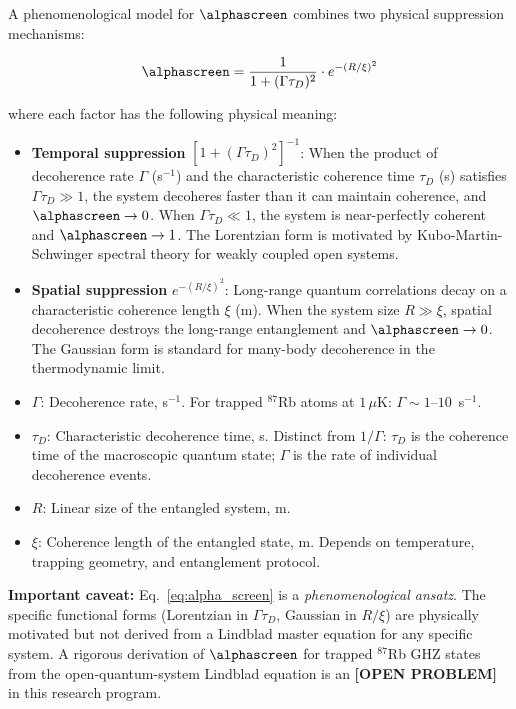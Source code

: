 A phenomenological model for $\alphascreen$ combines two physical
suppression mechanisms:

\begin{equation}
    \alphascreen = \frac{1}{1 + (\Gamma\tau_D)^2}
    \cdot e^{-(R/\xi)^2}
    \label{eq:alpha_screen}
\end{equation}

\noindent where each factor has the following physical meaning:

\begin{itemize}
    \item \textbf{Temporal suppression} $[1 + (\Gamma\tau_D)^2]^{-1}$:
    When the product of decoherence rate $\Gamma$ (s$^{-1}$) and the
    characteristic coherence time $\tau_D$ (s) satisfies
    $\Gamma\tau_D \gg 1$, the system decoheres faster than it can maintain
    coherence, and $\alphascreen \to 0$. When $\Gamma\tau_D \ll 1$, the
    system is near-perfectly coherent and $\alphascreen \to 1$. The
    Lorentzian form is motivated by Kubo-Martin-Schwinger spectral theory
    for weakly coupled open systems.

    \item \textbf{Spatial suppression} $e^{-(R/\xi)^2}$: Long-range
    quantum correlations decay on a characteristic coherence length $\xi$
    (m). When the system size $R \gg \xi$, spatial decoherence destroys
    the long-range entanglement and $\alphascreen \to 0$. The Gaussian
    form is standard for many-body decoherence in the thermodynamic limit.

    \item $\Gamma$: Decoherence rate, s$^{-1}$. For trapped $^{87}$Rb
    atoms at $1\,\mu$K: $\Gamma \sim 1$--$10$~s$^{-1}$.

    \item $\tau_D$: Characteristic decoherence time, s. Distinct from
    $1/\Gamma$: $\tau_D$ is the coherence time of the macroscopic
    quantum state; $\Gamma$ is the rate of individual decoherence events.

    \item $R$: Linear size of the entangled system, m.

    \item $\xi$: Coherence length of the entangled state, m. Depends on
    temperature, trapping geometry, and entanglement protocol.
\end{itemize}

\noindent\textbf{Important caveat:} Eq.~\eqref{eq:alpha_screen} is a
\emph{phenomenological ansatz}. The specific functional forms (Lorentzian
in $\Gamma\tau_D$, Gaussian in $R/\xi$) are physically motivated but not
derived from a Lindblad master equation for any specific system. A
rigorous derivation of $\alphascreen$ for trapped $^{87}$Rb GHZ states
from the open-quantum-system Lindblad equation is an \textbf{[OPEN PROBLEM]}
in this research program.

